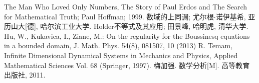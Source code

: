 \begin{thebibliography}{}
  The Man Who Loved Only Numbers, The Story of Paul Erdos and The Search for Mathematical Truth; Paul Hoffman; 1999.
  数域的上同调; 尤尔根$\cdot$诺伊基希, 亚历山大[德], 哈尔滨工业大学.
  Holder不等式及其应用; 田景峰, 哈明虎, 清华大学.
  Hu, W., Kukavica, I., Ziane, M.: On the regularity for the Boussinesq equations in a bounded domain, J. Math. Phys. 54(8), 081507, 10 (2013)
  R. Temam, Infinite Dimensional Dynamical Systems in Mechanics and Physics, Applied Mathematical Sciences Vol. 68
 (Springer, 1997).
  梅加强. 数学分析[M]. 高等教育出版社, 2011.
\end{thebibliography}
